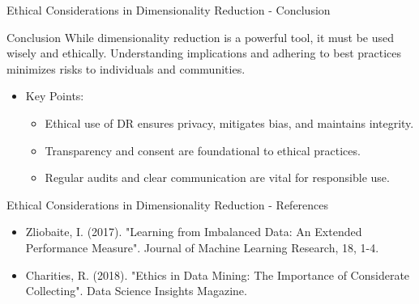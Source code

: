 \documentclass[aspectratio=169]{beamer}
\begin{document}
\begin{frame}[fragile]{Ethical Considerations in Dimensionality Reduction - Conclusion}
    \begin{block}{Conclusion}
        While dimensionality reduction is a powerful tool, it must be used wisely and ethically. 
        Understanding implications and adhering to best practices minimizes risks to individuals and communities.
    \end{block}
    \begin{itemize}
        \item Key Points:
        \begin{itemize}
            \item Ethical use of DR ensures privacy, mitigates bias, and maintains integrity.
            \item Transparency and consent are foundational to ethical practices.
            \item Regular audits and clear communication are vital for responsible use.
        \end{itemize}
    \end{itemize}
\end{frame}

\begin{frame}[fragile]{Ethical Considerations in Dimensionality Reduction - References}
    \begin{itemize}
        \item Zliobaite, I. (2017). "Learning from Imbalanced Data: An Extended Performance Measure". Journal of Machine Learning Research, 18, 1-4.
        \item Charities, R. (2018). "Ethics in Data Mining: The Importance of Considerate Collecting". Data Science Insights Magazine.
    \end{itemize}
\end{frame}
\end{document}
